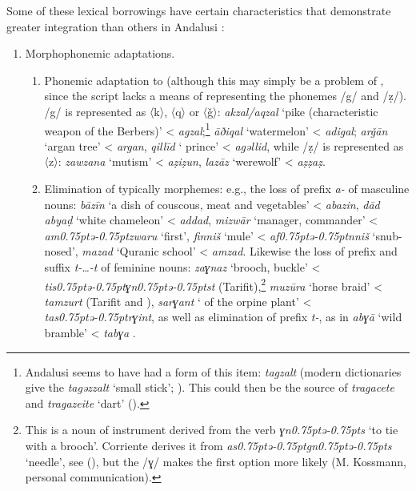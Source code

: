 \documentclass[output=paper,modfonts,nonflat]{langsci/langscibook}
\begin{document}
Some of these lexical borrowings have certain characteristics that demonstrate greater integration than others in Andalusi : 

\begin{enumerate}
\item Morphophonemic adaptations.

\begin{enumerate}
\item Phonemic adaptation to  (although this may simply be a problem of , since the  script lacks a means of representing the  phonemes /g/ and /ẓ/). /g/ is represented as 〈k〉, 〈q〉 or 〈ǧ〉: \textit{akzal/aqzal} ‘pike (characteristic weapon of the Berbers)’ < \textit{agzal};\footnote{Andalusi  seems to have had a  form of this item: \textit{tagzalt} (modern dictionaries give the  \textit{tagǝzzalt} ‘small stick’; \citealt{Taïfi1991}). This could then be the source of  \textit{tragacete} and  \textit{tragazeite} ‘dart’ (\citealt{CorrientePereiraVicenteforthcoming}).}  \textit{āðiqal} ‘watermelon’ < \textit{adigal}; \textit{arǧān} ‘argan tree’ < \textit{argan}, \textit{qillīd} ‘ prince’ < \textit{agǝllid}, while /ẓ/ is represented as 〈z〉: \textit{zawzana} ‘mutism’ < \textit{aẓiẓun}, \textit{lazāz} ‘werewolf’ < \textit{aẓẓaẓ}. 

\item Elimination of typically  morphemes: e.g., the loss of prefix \textit{a-} of masculine nouns: \textit{bāzīn} ‘a dish of couscous, meat and vegetables’ < \textit{abazin}, \textit{dād} \textit{abyaḍ} ‘white chameleon’ < \textit{addad}, \textit{mizwār} ‘manager, commander’ < \textit{am\kern 0.75ptǝ\kern -0.75ptzwaru} ‘first’, \textit{finniš} `mule' < \textit{af\kern 0.75ptǝ\kern -0.75ptnniš} `snub-nosed', \textit{mazad} ‘Quranic school’ < \textit{amzad}. Likewise the loss of prefix and suffix \textit{t-…-t} of feminine nouns: \textit{zaɣnaz} ‘brooch, buckle’ < \textit{tis\kern 0.75ptǝ\kern -0.75ptɣn\kern 0.75ptǝ\kern -0.75ptst} (Tarifit),\footnote{This is a noun of instrument derived from the verb \textit{ɣn\kern 0.75ptǝ\kern -0.75pts} ‘to tie with a brooch’. Corriente derives it from \textit{as\kern 0.75ptǝ\kern -0.75ptgn\kern 0.75ptǝ\kern -0.75pts} ‘needle’, see (\citealt{CorrientePereiraVicenteforthcoming}), but the  /ɣ/ makes the first option more likely (M. Kossmann, personal communication).} \textit{muzūra} ‘horse braid’ < \textit{tamzurt} (Tarifit and ), \textit{sarɣant} ‘ of the orpine plant’ < \textit{tas\kern 0.75ptǝ\kern -0.75ptrɣint}, as well as elimination of prefix \textit{t-}, as in \textit{abɣā} ‘wild bramble’ < \textit{tabɣa} . 
\end{enumerate}


\end{enumerate}
\end{document}
